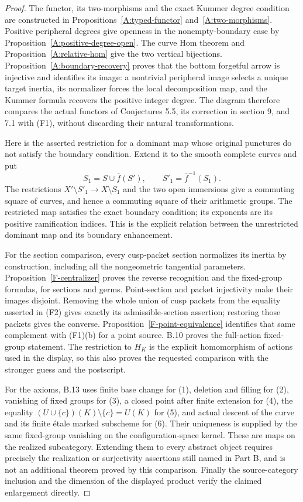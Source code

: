 \documentclass[11pt,oneside]{article}
\begin{document}
\begin{proof}
The functor, its two-morphisms and the exact Kummer degree
condition are constructed in Propositions~\ref{A:typed-functor}
and~\ref{A:two-morphisms}. Positive peripheral degrees give
openness in the nonempty-boundary case by
Proposition~\ref{A:positive-degree-open}. The curve Hom theorem
and Proposition~\ref{A:relative-hom} give the two vertical
bijections. Proposition~\ref{A:boundary-recovery} proves that
the bottom forgetful arrow is injective and identifies its
image: a nontrivial peripheral image selects a unique target
inertia, its normalizer forces the local decomposition map,
and the Kummer formula recovers the positive integer degree.
The diagram therefore compares the actual functors of
Conjectures 5.5, its correction in section 9, and 7.1 with
(F1), without discarding their natural transformations.

Here is the asserted restriction for a dominant map whose
original punctures do not satisfy the boundary condition.
Extend it to the smooth complete curves and put
\[
 S_1=S\cup\overline f(S'),\qquad
 S'_1=\overline f^{-1}(S_1).
\]
The restrictions $X'\setminus S'_1\to X\setminus S_1$ and
the two open immersions give a commuting square of curves,
and hence a commuting square of their arithmetic groups.
The restricted map satisfies the exact boundary condition;
its exponents are its positive ramification indices. This is
the explicit relation between the unrestricted dominant map
and its boundary enhancement.

For the section comparison, every cusp-packet section
normalizes its inertia by construction, including all the
nongeometric tangential parameters. Proposition~\ref{F-centralizer}
proves the reverse recognition and the fixed-group formulas,
for sections and germs. Point-section and packet injectivity
make their images disjoint. Removing the whole union of cusp
packets from the equality asserted in (F2) gives exactly its
admissible-section assertion; restoring those packets gives
the converse. Proposition~\ref{F-point-equivalence} identifies
that same complement with (F1)(b) for a point source.
B.10 proves the full-action fixed-group statement. The
restriction to $H_K$ is the explicit homomorphism of actions
used in the display, so this also proves the requested
comparison with the stronger guess and the postscript.

For the axioms, B.13 uses finite base change for (1), deletion
and filling for (2), vanishing of fixed groups for (3), a
closed point after finite extension for (4), the equality
$(U\cup\{c\})(K)\setminus\{c\}=U(K)$ for (5), and
actual descent of the curve and its finite \'etale marked
subscheme for (6). Their uniqueness is supplied by the same
fixed-group vanishing on the configuration-space kernel.
These are maps on the realized subcategory. Extending them
to every abstract object requires precisely the realization
or surjectivity assertions still named in Part B, and is not
an additional theorem proved by this comparison. Finally the
source-category inclusion and the dimension of the displayed
product verify the claimed enlargement directly.
\end{proof}
\end{document}
